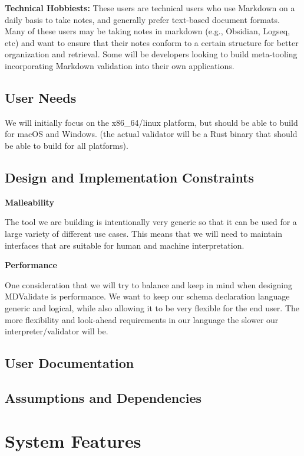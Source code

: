 \documentclass[
]{article}
\begin{document}
\textbf{Technical Hobbiests:} These users are technical users who use
Markdown on a daily basis to take notes, and generally prefer text-based
document formats. Many of these users may be taking notes in markdown
(e.g., Obsidian, Logseq, etc) and want to ensure that their notes
conform to a certain structure for better organization and retrieval.
Some will be developers looking to build meta-tooling incorporating
Markdown validation into their own applications.

\subsection{User Needs}\label{user-needs}

We will initially focus on the x86\_64/linux platform, but should be
able to build for macOS and Windows. (the actual validator will be a
Rust binary that should be able to build for all platforms).

\subsection{Design and Implementation
Constraints}\label{design-constraints}

\textbf{Malleability}

The tool we are building is intentionally very generic so that it can be
used for a large variety of different use cases. This means that we will
need to maintain interfaces that are suitable for human and machine
interpretation.

\textbf{Performance}

One consideration that we will try to balance and keep in mind when
designing MDValidate is performance. We want to keep our schema
declaration language generic and logical, while also allowing it to be
very flexible for the end user. The more flexibility and look-ahead
requirements in our language the slower our interpreter/validator will
be.

\subsection{User Documentation}\label{user-documentation}

\subsection{Assumptions and
Dependencies}\label{assumptions-dependencies}

\section{System Features}\label{system-features}
\end{document}
